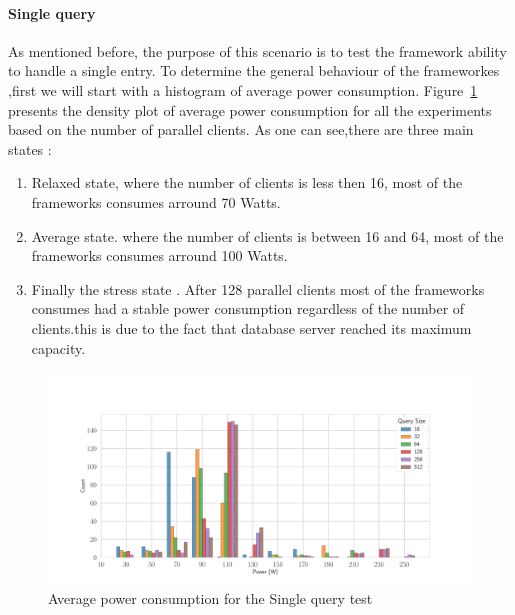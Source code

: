 \paragraph{Single query}
As mentioned before, the purpose of this scenario is to test the framework ability to handle a single entry.
To determine the general behaviour of the frameworkes ,first we will start with a histogram of average power consumption. Figure~\ref{fig:av_power_db} presents the  density plot of average power consumption  for all the experiments based on the number of parallel clients. As one can see,there are three main states :
\begin{enumerate}
    \item Relaxed state, where the number of clients is less then 16, most of the frameworks consumes arround 70 Watts.
    \item Average state. where the number of clients is between 16 and 64, most of the frameworks consumes arround 100 Watts.
    \item Finally the stress state . After 128 parallel clients most of the frameworks consumes had a stable power consumption regardless of the number of clients.this is due to the fact that database server reached its maximum capacity. %
\end{enumerate}
\begin{figure}[hbt]
    \centering
    \includegraphics[width=
        \columnwidth]{imgs/histogram_av_power_cpu_db}
    \caption{Average power consumption for the Single query test }
    \label{fig:av_power_db}
\end{figure}


